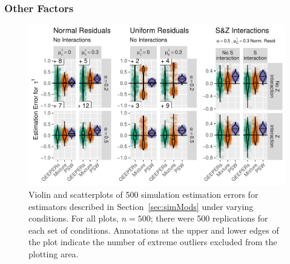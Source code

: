 \documentclass{statsoc} %
\begin{document}

\subsubsection{Other Factors}


\begin{figure}
  \centering
  \includegraphics[width=\textwidth]{../simFigs/boxplots.pdf}
  \caption{Violin and scatterplots of 500 simulation estimation errors for estimators described in Section~\ref{sec:simMods} under varying conditions. For all plots, $n=500$; there were 500 replications for each set of conditions. Annotations at the upper and lower edges of the plot indicate the number of extreme outliers excluded from the plotting area.}
  \label{fig:boxplots}
\end{figure}
\end{document}
